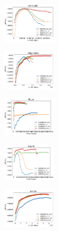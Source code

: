
\begin{subfigure}
     \centering
         \includegraphics[width=0.24\textwidth]{fig/astro-ph_fig__entropy}
\end{subfigure}
\begin{subfigure}
         \centering
      \includegraphics[width=0.24\textwidth]{fig/digg-reply_fig__entropy}               
\end{subfigure}                                                                          
\begin{subfigure}                                                                        
         \centering                                                                      
      \includegraphics[width=0.24\textwidth]{fig/fb_uc_fig__entropy}
\end{subfigure}                                                                          
\begin{subfigure}                                                                        
         \centering                                                                      
      \includegraphics[width=0.24\textwidth]{fig/hep-th_fig__entropy}
\end{subfigure}                                                                          
\begin{subfigure}                                                                        
     \centering                                                                          
         \includegraphics[width=0.24\textwidth]{fig/enron_fig__entropy}
\end{subfigure}
